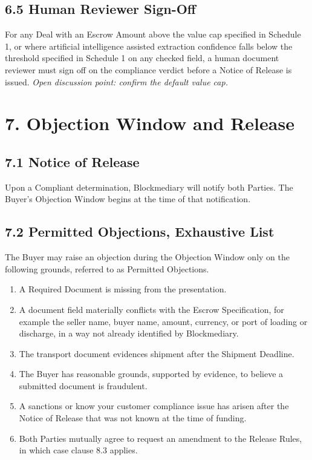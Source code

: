 \documentclass[12pt, a4paper]{article}
\begin{document}
\subsection*{6.5 Human Reviewer Sign-Off}

For any Deal with an Escrow Amount above the value cap specified in Schedule 1, or where
artificial intelligence assisted extraction confidence falls below the threshold specified
in Schedule 1 on any checked field, a human document reviewer must sign off on the
compliance verdict before a Notice of Release is issued. \textit{Open discussion point:
confirm the default value cap.}

\section*{7. Objection Window and Release}

\subsection*{7.1 Notice of Release}

Upon a Compliant determination, Blockmediary will notify both Parties. The Buyer's
Objection Window begins at the time of that notification.

\subsection*{7.2 Permitted Objections, Exhaustive List}

The Buyer may raise an objection during the Objection Window only on the following
grounds, referred to as Permitted Objections.

\begin{enumerate}[label=(\alph*)]
\item A Required Document is missing from the presentation.
\item A document field materially conflicts with the Escrow Specification, for example the
seller name, buyer name, amount, currency, or port of loading or discharge, in a way not
already identified by Blockmediary.
\item The transport document evidences shipment after the Shipment Deadline.
\item The Buyer has reasonable grounds, supported by evidence, to believe a submitted
document is fraudulent.
\item A sanctions or know your customer compliance issue has arisen after the Notice of
Release that was not known at the time of funding.
\item Both Parties mutually agree to request an amendment to the Release Rules, in which
case clause 8.3 applies.
\end{enumerate}
\end{document}
